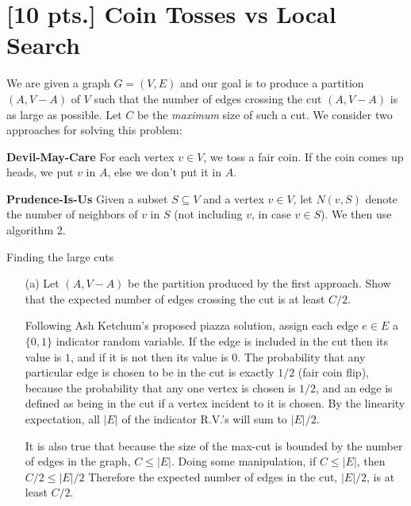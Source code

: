 \documentclass[11pt]{article}
\begin{document}
\newpage

\section{[10 pts.] Coin Tosses vs Local Search}

We are given a graph $G = (V,E)$ and our goal is to produce a partition
$(A,V-A)$ of $V$ such that the number of edges crossing the cut $(A,V-A)$
is as large as possible. Let $C$ be the \emph{maximum} size of such a cut. We
consider two approaches for solving this problem:

{\bf Devil-May-Care} For each vertex $v \in V$, we toss a fair coin. If the coin
comes up heads, we put $v$ in $A$, else we don't put it in $A$. 

{\bf Prudence-Is-Us} Given a subset $S\subseteq V$ and a vertex $v \in V$, let
$N(v,S)$ denote the number of neighbors of $v$ in $S$ (not including $v$, 
in case $v \in S$). We then use algorithm 2.

\begin{algorithm}
  \caption{Finding the large cuts}
  \begin{algorithmic}
    \Repeat
    \EndIf
  \end{algorithmic}
\end{algorithm}

\begin{itemize}
  \item[(a)] Let $(A,V-A)$ be the partition produced by the first approach.
    Show that the expected number of edges crossing the cut is at least $C/2$.
    
    Following Ash Ketchum's proposed piazza solution, assign each edge $e\in E$
    a $\{0,1\}$ indicator random variable. If the edge is included in the cut then
    its value is $1$, and if it is not then its value is $0$. The probability that
    any particular edge is chosen to be in the cut is exactly $1/2$ (fair coin 
    flip), because the probability that any one vertex is chosen is $1/2$, and an
    edge is defined as being in the cut if a vertex incident to it is chosen. 
    By the linearity expectation, all $|E|$ of the indicator R.V.'s will sum to
    $|E|/2$. 
    
    It is also true that because the size of the max-cut is bounded by the number of 
    edges in the graph, $C\leq |E|$. Doing some manipulation, if $C\leq |E|$,
    then $C/2\leq |E|/2$ Therefore the expected number of edges 
    in the cut, $|E|/2$, is at least $C/2$. 
    
  \end{itemize}
\end{document}
